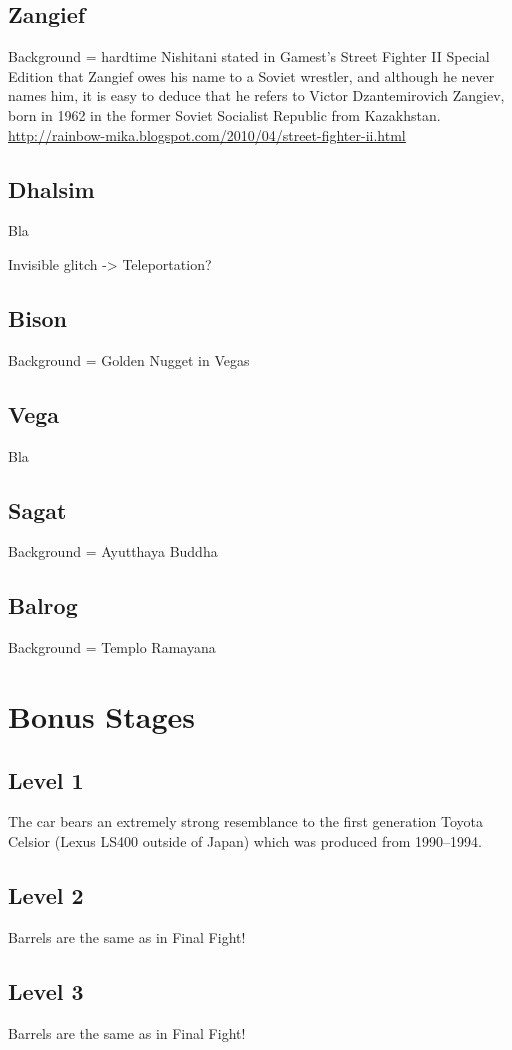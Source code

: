 \subsection{Zangief} 
Background = hardtime
Nishitani stated in Gamest's Street Fighter II Special Edition that Zangief owes his name to a Soviet wrestler, and although he never names him, it is easy to deduce that he refers to Victor Dzantemirovich Zangiev, born in 1962 in the former Soviet Socialist Republic from Kazakhstan. \url{http://rainbow-mika.blogspot.com/2010/04/street-fighter-ii.html}

\subsection{Dhalsim} Bla

Invisible glitch -> Teleportation?\cite{dalhsimGlitch}

\subsection{Bison} 
Background = Golden Nugget in Vegas
\subsection{Vega} Bla
\subsection{Sagat} 
Background = Ayutthaya Buddha
\subsection{Balrog}
Background = Templo Ramayana

\section{Bonus Stages}
\subsection{Level 1}
 The car bears an extremely strong resemblance to the first generation Toyota Celsior (Lexus LS400 outside of Japan) which was produced from 1990–1994.

\subsection{Level 2}
Barrels are the same as in Final Fight!
\subsection{Level 3}
Barrels are the same as in Final Fight!
